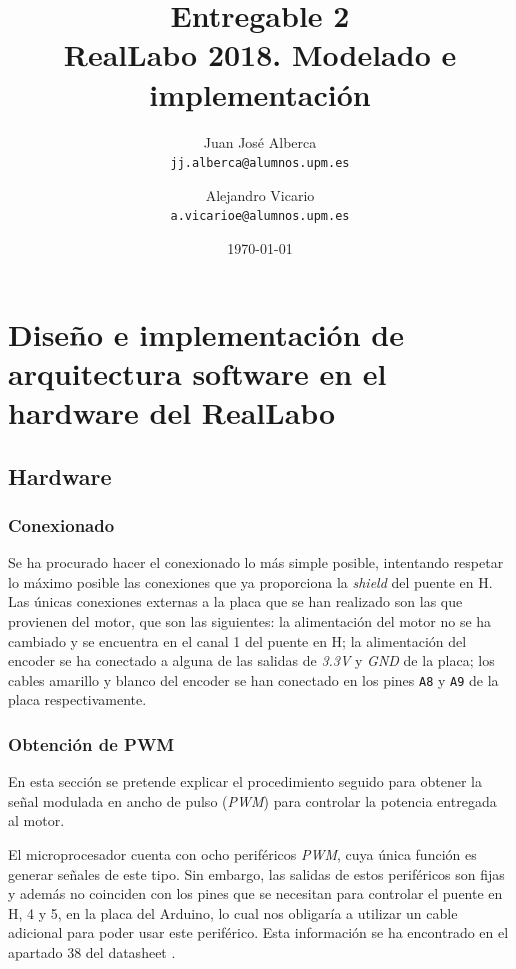 \documentclass[a4paper]{article}
\begin{document}
\title{Entregable 2 \\
\large RealLabo 2018. Modelado e implementación}
\author{
	Juan José Alberca\\
	\texttt{jj.alberca@alumnos.upm.es}
	\and
	Alejandro Vicario\\
	\texttt{a.vicarioe@alumnos.upm.es}
}
\date{\today}


\maketitle


\section{Diseño e implementación de arquitectura software en el hardware del RealLabo}
\subsection{Hardware}

\subsubsection{Conexionado}
Se ha procurado hacer el conexionado lo más simple posible, intentando respetar lo máximo posible las conexiones que ya proporciona la \emph{shield} del puente en H.
Las únicas conexiones externas a la placa que se han realizado son las que provienen del motor, que son las siguientes:
la alimentación del motor no se ha cambiado y se encuentra en el canal 1 del puente en H;
la alimentación del encoder se ha conectado a alguna de las salidas de \emph{3.3V} y \emph{GND} de la placa;
los cables amarillo y blanco del encoder se han conectado en los pines \texttt{A8} y \texttt{A9} de la placa respectivamente.

\subsubsection{Obtención de PWM}
En esta sección se pretende explicar el procedimiento seguido para obtener la señal modulada en ancho de pulso (\emph{PWM}) para controlar la potencia entregada al motor.

El microprocesador cuenta con ocho periféricos \emph{PWM}, cuya única función es generar señales de este tipo. Sin embargo,
las salidas de estos periféricos son fijas y además no coinciden con los pines que se necesitan para controlar el puente en H, 4 y 5, en la placa del Arduino,
lo cual nos obligaría a utilizar un cable adicional para poder usar este periférico. Esta información se ha encontrado en el apartado 38 del datasheet \cite{SAM3X/A}.
\end{document}
